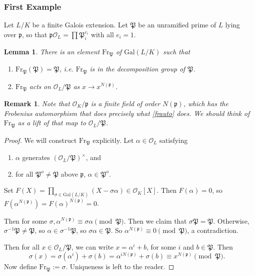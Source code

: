 \documentclass[letterpaper, 12pt]{article}
\newtheorem{rmk}{Remark}
\newtheorem{lem}[thm]{Lemma}
\newcommand{\roi}[1]{\mathcal{O}_{#1}}
\newcommand{\gal}[3]{\mathrm{Gal}(#1 #2 #3)}
\renewcommand{\prime}{\mathfrak{p}}
\newcommand{\oprime}{\mathfrak{P}}
\newcommand{\oprimealt}{\oprime^o}
\newcommand{\frob}[1]{\mathrm{Fr}_{#1}}
\newcommand{\N}[1]{N(#1)}
\begin{document}
\subsubsection{First Example}
Let $L/K$ be a finite Galois extension. Let $\oprime$ be an unramified prime of $L$
lying over $\prime$, so that $\prime \roi L = \prod \oprime_i^{e_i}$ with all $e_i = 1$.
\begin{lem}
There is an element $\frob \oprime$ of $\gal L/K$ such that
\begin{enumerate}[1)]

\item $\frob \oprime (\oprime) = \oprime$, i.e. $\frob \oprime$ is in the
decomposition group of $\oprime$.
\item \label{frauto} $\frob \oprime$ acts on $\roi L / \oprime$ as
 $x \rightarrow x^{N(\prime)}$.

\end{enumerate}
\end{lem}
\begin{rmk}

Note that $\roi K / \prime$ is a finite field of order $N(\prime)$, which has
the Frobenius automorphism that does precisely what \ref{frauto} does. We
should think of $\frob \oprime$ as a lift of that map to $\roi L/\oprime$.

\end{rmk}

\begin{proof}
We will construct $\frob \oprime$ explicitly. Let $\alpha \in \roi L$ satisfying
\begin{enumerate}
\item $\alpha$ generates $(\roi L/\oprime)^{\times}$, and
\item for all $\oprimealt \neq \oprime$ above $\prime$, $\alpha \in \oprimealt$.
\end{enumerate}

Set $F(X) = \displaystyle \prod_{\sigma \in \gal L/K} (X - \sigma \alpha) \in
\roi K[X].$ Then $F(\alpha) = 0$, so $F(\alpha^{\N \prime}) = F(\alpha)^{\N
\prime} = 0$.

Then for some $\sigma, \alpha^{\N \prime} \equiv \sigma \alpha \pmod \oprime$.
Then we claim that $\sigma \oprime = \oprime$. Otherwise, $\sigma^{-1} \oprime
\neq \oprime$, so $\alpha \in \sigma^{-1} \oprime$, so $\sigma \alpha \in
\oprime$. So $\alpha^{\N \prime} \equiv 0 \pmod \oprime$, a contradiction.

Then for all $x \in \roi L / \oprime$, we can write $x = \alpha^i + b$, for
some $i$ and $b \in \oprime$. Then \[\sigma(x) = \sigma(\alpha^i) + \sigma(b)
= \alpha^{i \N \prime} + \sigma(b) \equiv x^{\N \prime} \pmod \oprime.\] Now
define $\frob \oprime := \sigma$. Uniqueness is left to the reader.
\end{proof}
\end{document}
